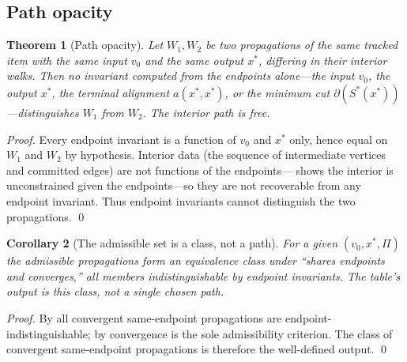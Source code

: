 \documentclass[11pt,twocolumn,a4paper]{article}
\theoremstyle{thmstyle}
\newtheorem{theorem}{Theorem}[section]
\newtheorem{corollary}[theorem]{Corollary}
\theoremstyle{definition}
\theoremstyle{remark}
\newcommand{\cut}{\partial}              %
\newcommand{\Proc}{\Pi}                  %
\begin{document}
\subsection{Path opacity}

\begin{theorem}[Path opacity]
\label{thm:path-opacity}
Let $W_1,W_2$ be two propagations of the same tracked item with the same
input $v_0$ and the same output $x^{\ast}$, differing in their interior
walks. Then no invariant computed from the endpoints alone---the input
$v_0$, the output $x^{\ast}$, the terminal alignment $a(x^{\ast},x^{\ast})$,
or the minimum cut $\cut(S^{\ast}(x^{\ast}))$---distinguishes $W_1$ from
$W_2$. The interior path is free.
\end{theorem}

\begin{proof}
Every endpoint invariant is a function of $v_0$ and $x^{\ast}$ only, hence
equal on $W_1$ and $W_2$ by hypothesis. Interior data (the sequence of
intermediate vertices and committed edges) are not functions of the
endpoints--- shows the interior is unconstrained
given the endpoints---so they are not recoverable from any endpoint
invariant. Thus endpoint invariants cannot distinguish the two
propagations. \qed
\end{proof}

\begin{corollary}[The admissible set is a class, not a path]
\label{cor:gauge}
For a given $(v_0,x^{\ast},\Proc)$ the admissible propagations form an
equivalence class under ``shares endpoints and converges,'' all members
indistinguishable by endpoint invariants. The table's output is this
class, not a single chosen path.
\end{corollary}

\begin{proof}
By  all convergent same-endpoint propagations are
endpoint-indistinguishable; by  convergence is the
sole admissibility criterion. The class of convergent same-endpoint
propagations is therefore the well-defined output. \qed
\end{proof}
\end{document}
